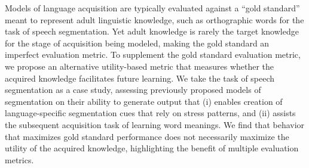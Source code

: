 Models of language acquisition are typically evaluated against a ``gold standard'' meant to represent adult linguistic knowledge, such as orthographic words for the task of speech segmentation. Yet adult knowledge is rarely the target knowledge for the stage of acquisition being modeled, making the gold standard an imperfect evaluation metric. To supplement the gold standard evaluation metric, we propose an alternative utility-based metric that measures whether the acquired knowledge facilitates future learning. We take the task of speech segmentation as a case study, assessing previously proposed models of segmentation on their ability to generate output that (i) enables creation of language-specific segmentation cues that rely on stress patterns, and (ii) assists the subsequent acquisition task of learning word meanings. We find that behavior that maximizes gold standard performance does not necessarily maximize the utility of the acquired knowledge, highlighting the benefit of multiple evaluation metrics.
